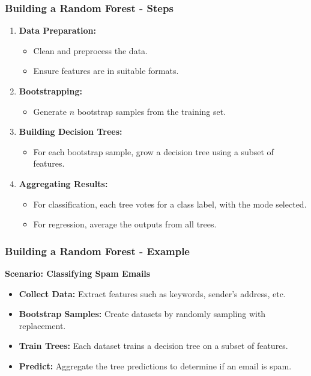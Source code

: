 \documentclass[aspectratio=169]{beamer}
\begin{document}
\begin{frame}[fragile]
    \frametitle{Building a Random Forest - Steps}
    \begin{enumerate}
        \item \textbf{Data Preparation:}
        \begin{itemize}
            \item Clean and preprocess the data.
            \item Ensure features are in suitable formats.
        \end{itemize}
        
        \item \textbf{Bootstrapping:}
        \begin{itemize}
            \item Generate \( n \) bootstrap samples from the training set.
        \end{itemize}

        \item \textbf{Building Decision Trees:}
        \begin{itemize}
            \item For each bootstrap sample, grow a decision tree using a subset of features.
        \end{itemize}

        \item \textbf{Aggregating Results:}
        \begin{itemize}
            \item For classification, each tree votes for a class label, with the mode selected.
            \item For regression, average the outputs from all trees.
        \end{itemize}
    \end{enumerate}
\end{frame}

\begin{frame}[fragile]
    \frametitle{Building a Random Forest - Example}
    \textbf{Scenario: Classifying Spam Emails}
    \begin{itemize}
        \item \textbf{Collect Data:} Extract features such as keywords, sender's address, etc.
        \item \textbf{Bootstrap Samples:} Create datasets by randomly sampling with replacement.
        \item \textbf{Train Trees:} Each dataset trains a decision tree on a subset of features.
        \item \textbf{Predict:} Aggregate the tree predictions to determine if an email is spam.
    \end{itemize}
\end{frame}
\end{document}
